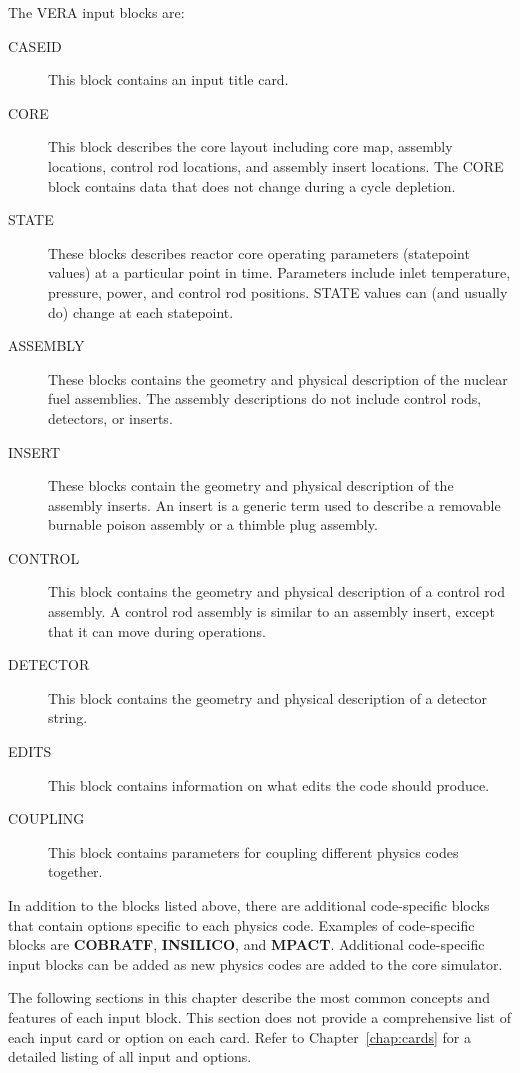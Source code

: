 \documentclass{report}
\numberwithin{equation}{section}
\begin{document}
The VERA input blocks are:
\begin{description}
\item[CASEID] This block contains an input title card.
\item[CORE] This block describes the core layout including core map, assembly locations,
  control rod locations, and assembly insert locations.  The CORE block contains data that does not change
  during a cycle depletion.
\item[STATE] These blocks describes reactor core operating parameters (statepoint values)
  at a particular point in time.
  Parameters include inlet temperature, pressure, power, and control rod positions.  
  STATE values can (and usually do) change at each statepoint.
\item[ASSEMBLY] These blocks contains the geometry and physical description of the nuclear fuel assemblies.
  The assembly descriptions do not include control rods, detectors, or inserts.
\item[INSERT] These blocks contain the geometry and physical description of the assembly inserts. 
   An insert is a generic term used to describe a removable burnable poison assembly or a thimble plug assembly.
\item[CONTROL] This block contains the geometry and physical description of a control rod assembly.
   A control rod assembly is similar to an assembly insert, except that it can move
   during operations.
\item[DETECTOR] This block contains the geometry and physical description of a detector string.
\item[EDITS] This block contains information on what edits the code should produce.
\item[COUPLING] This block contains parameters for coupling different physics codes together.
\end{description}

In addition to the blocks listed above, there are additional code-specific blocks that contain
options specific to each physics code.
Examples of code-specific blocks are {\bf COBRATF}, {\bf INSILICO}, and {\bf MPACT}.
Additional code-specific input blocks can be added as new physics codes are added to the core simulator.

The following sections in this chapter describe the most common concepts and features of each input block.
This section does not provide a comprehensive list of each input card or option on each card.  
Refer to Chapter~\ref{chap:cards} for a detailed listing of all input and options.
\end{document}
